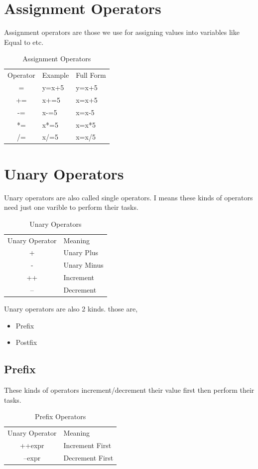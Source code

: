 \documentclass[A4 paper,openany]{book}  %
\begin{document}
\section{Assignment Operators}
Assignment operators\cite{Ref8} are those we use for assigning values into variables like Equal to etc.
% 
% 
\begin{table}[htbp]
    \begin{tabular}{cll}
        Operator & Example & Full Form \\
        =        & y=x+5   & y=x+5     \\
        +=       & x+=5    & x=x+5     \\
        -=       & x-=5    & x=x-5     \\
        *=       & x*=5    & x=x*5     \\
        /=       & x/=5    & x=x/5
    \end{tabular}
    \centering
    \caption{Assignment Operators}
\end{table}
% 
% 
\section{Unary Operators}
Unary operators\cite{Ref8} are also called single operators. I means these kinds of operators need just one varible to perform their tasks.
% 
% 
\begin{table}[htbp]
    \begin{tabular}{cl}
        Unary Operator & Meaning     \\
        +              & Unary Plus  \\
        -              & Unary Minus \\
        ++             & Increment   \\
        --             & Decrement
    \end{tabular}
    \centering
    \caption{Unary Operators}
\end{table}
Unary operators are also 2 kinds. those are,
\begin{itemize}
    \item Prefix
    \item Postfix
\end{itemize}
% 
% 
\subsection{Prefix}
These kinds of operators\cite{Ref8} increment/decrement their value first then perform their tasks.
% 
% 
\begin{table}[htbp]
    \begin{tabular}{cl}
        Unary Operator & Meaning         \\
        ++expr         & Increment First \\
        --expr         & Decrement First
    \end{tabular}
    \centering
    \caption{Prefix Operators}
\end{table}
% 
% 
\end{document}
